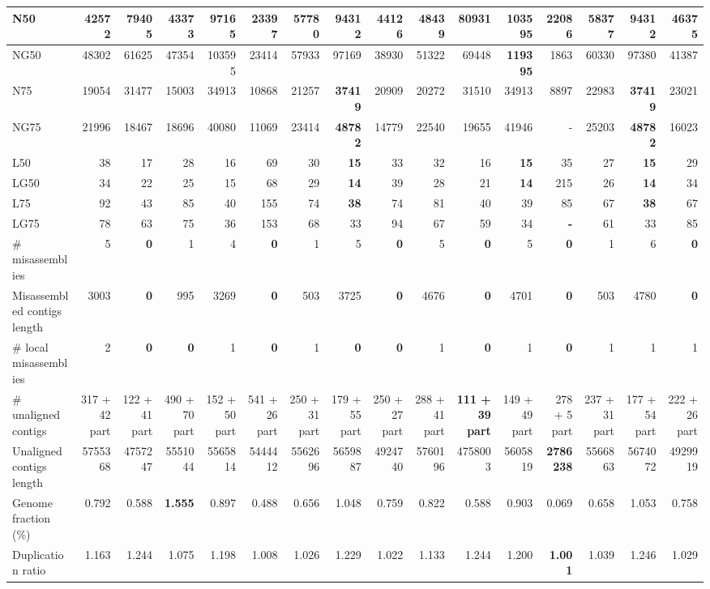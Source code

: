 \documentclass[12pt,a4paper]{article}
\begin{document}
\begin{table}[ht]
\begin{center}
\begin{tabular}{|l*{15}{|r}|}
N50 & 42572 & 79405 & 43373 & 97165 & 23397 & 57780 & 94312 & 44126 & 48439 & 80931 & {\bf 103595} & 22086 & 58377 & 94312 & 46375 \\ \hline
NG50 & 48302 & 61625 & 47354 & 103595 & 23414 & 57933 & 97169 & 38930 & 51322 & 69448 & {\bf 119395} & 1863 & 60330 & 97380 & 41387 \\ \hline
N75 & 19054 & 31477 & 15003 & 34913 & 10868 & 21257 & {\bf 37419} & 20909 & 20272 & 31510 & 34913 & 8897 & 22983 & {\bf 37419} & 23021 \\ \hline
NG75 & 21996 & 18467 & 18696 & 40080 & 11069 & 23414 & {\bf 48782} & 14779 & 22540 & 19655 & 41946 & - & 25203 & {\bf 48782} & 16023 \\ \hline
L50 & 38 & 17 & 28 & 16 & 69 & 30 & {\bf 15} & 33 & 32 & 16 & {\bf 15} & 35 & 27 & {\bf 15} & 29 \\ \hline
LG50 & 34 & 22 & 25 & 15 & 68 & 29 & {\bf 14} & 39 & 28 & 21 & {\bf 14} & 215 & 26 & {\bf 14} & 34 \\ \hline
L75 & 92 & 43 & 85 & 40 & 155 & 74 & {\bf 38} & 74 & 81 & 40 & 39 & 85 & 67 & {\bf 38} & 67 \\ \hline
LG75 & 78 & 63 & 75 & 36 & 153 & 68 & 33 & 94 & 67 & 59 & 34 & {\bf -} & 61 & 33 & 85 \\ \hline
\# misassemblies & 5 & {\bf 0} & 1 & 4 & {\bf 0} & 1 & 5 & {\bf 0} & 5 & {\bf 0} & 5 & {\bf 0} & 1 & 6 & {\bf 0} \\ \hline
Misassembled contigs length & 3003 & {\bf 0} & 995 & 3269 & {\bf 0} & 503 & 3725 & {\bf 0} & 4676 & {\bf 0} & 4701 & {\bf 0} & 503 & 4780 & {\bf 0} \\ \hline
\# local misassemblies & 2 & {\bf 0} & {\bf 0} & 1 & {\bf 0} & 1 & {\bf 0} & {\bf 0} & 1 & {\bf 0} & 1 & {\bf 0} & 1 & 1 & 1 \\ \hline
\# unaligned contigs & 317 + 42 part & 122 + 41 part & 490 + 70 part & 152 + 50 part & 541 + 26 part & 250 + 31 part & 179 + 55 part & 250 + 27 part & 288 + 41 part & {\bf 111 + 39 part} & 149 + 49 part & 278 + 5 part & 237 + 31 part & 177 + 54 part & 222 + 26 part \\ \hline
Unaligned contigs length & 5755368 & 4757247 & 5551044 & 5565814 & 5444412 & 5562696 & 5659887 & 4924740 & 5760196 & 4758003 & 5605819 & {\bf 2786238} & 5566863 & 5674072 & 4929919 \\ \hline
Genome fraction (\%) & 0.792 & 0.588 & {\bf 1.555} & 0.897 & 0.488 & 0.656 & 1.048 & 0.759 & 0.822 & 0.588 & 0.903 & 0.069 & 0.658 & 1.053 & 0.758 \\ \hline
Duplication ratio & 1.163 & 1.244 & 1.075 & 1.198 & 1.008 & 1.026 & 1.229 & 1.022 & 1.133 & 1.244 & 1.200 & {\bf 1.001} & 1.039 & 1.246 & 1.029 \\ \hline

\end{tabular}
\end{center}
\end{table}
\end{document}
